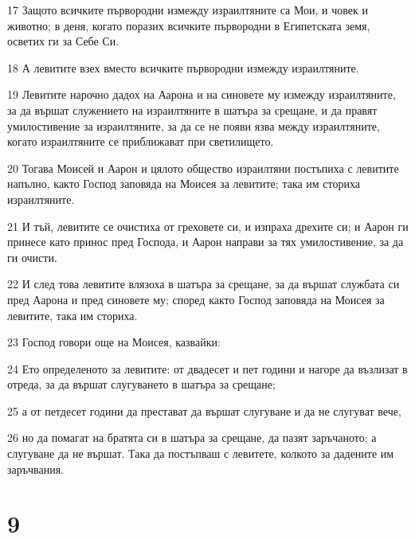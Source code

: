 \par 17 Защото всичките първородни измежду израилтяните са Мои, и човек и животно; в деня, когато поразих всичките първородни в Египетската земя, осветих ги за Себе Си.
\par 18 А левитите взех вместо всичките първородни измежду израилтяните.
\par 19 Левитите нарочно дадох на Аарона и на синовете му измежду израилтяните, за да вършат служението на израилтяните в шатъра за срещане, и да правят умилостивение за израилтяните, за да се не появи язва между израилтяните, когато израилтяните се приближават при светилището.
\par 20 Тогава Моисей и Аарон и цялото общество израилтяни постъпиха с левитите напълно, както Господ заповяда на Моисея за левитите; така им сториха израилтяните.
\par 21 И тъй, левитите се очистиха от греховете си, и изпраха дрехите си; и Аарон ги принесе като принос пред Господа, и Аарон направи за тях умилостивение, за да ги очисти.
\par 22 И след това левитите влязоха в шатъра за срещане, за да вършат службата си пред Аарона и пред синовете му; според както Господ заповяда на Моисея за левитите, така им сториха.
\par 23 Господ говори още на Моисея, казвайки:
\par 24 Ето определеното за левитите: от двадесет и пет години и нагоре да възлизат в отреда, за да вършат слугуването в шатъра за срещане;
\par 25 а от петдесет години да престават да вършат слугуване и да не слугуват вече,
\par 26 но да помагат на братята си в шатъра за срещане, да пазят заръчаното; а слугуване да не вършат. Така да постъпваш с левитете, колкото за дадените им заръчвания.

\chapter{9}

